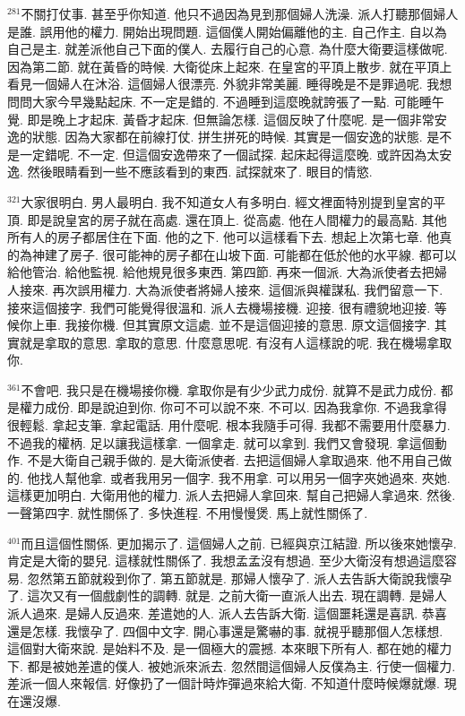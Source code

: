 \documentclass{book}
\begin{document}
$^{281}$不關打仗事.
甚至乎你知道.
他只不過因為見到那個婦人洗澡.
派人打聽那個婦人是誰.
誤用他的權力.
開始出現問題.
這個僕人開始偏離他的主.
自己作主.
自以為自己是主.
就差派他自己下面的僕人.
去履行自己的心意.
為什麼大衛要這樣做呢.
因為第二節.
就在黃昏的時候.
大衛從床上起來.
在皇宮的平頂上散步.
就在平頂上看見一個婦人在沐浴.
這個婦人很漂亮.
外貌非常美麗.
睡得晚是不是罪過呢.
我想問問大家今早幾點起床.
不一定是錯的.
不過睡到這麼晚就誇張了一點.
可能睡午覺.
即是晚上才起床.
黃昏才起床.
但無論怎樣.
這個反映了什麼呢.
是一個非常安逸的狀態.
因為大家都在前線打仗.
拼生拼死的時候.
其實是一個安逸的狀態.
是不是一定錯呢.
不一定.
但這個安逸帶來了一個試探.
起床起得這麼晚.
或許因為太安逸.
然後眼睛看到一些不應該看到的東西.
試探就來了.
眼目的情慾.

$^{321}$大家很明白.
男人最明白.
我不知道女人有多明白.
經文裡面特別提到皇宮的平頂.
即是說皇宮的房子就在高處.
還在頂上.
從高處.
他在人間權力的最高點.
其他所有人的房子都居住在下面.
他的之下.
他可以這樣看下去.
想起上次第七章.
他真的為神建了房子.
很可能神的房子都在山坡下面.
可能都在低於他的水平線.
都可以給他管治.
給他監視.
給他規見很多東西.
第四節.
再來一個派.
大為派使者去把婦人接來.
再次誤用權力.
大為派使者將婦人接來.
這個派與權謀私.
我們留意一下.
接來這個接字.
我們可能覺得很溫和.
派人去機場接機.
迎接.
很有禮貌地迎接.
等候你上車.
我接你機.
但其實原文這處.
並不是這個迎接的意思.
原文這個接字.
其實就是拿取的意思.
拿取的意思.
什麼意思呢.
有沒有人這樣說的呢.
我在機場拿取你.

$^{361}$不會吧.
我只是在機場接你機.
拿取你是有少少武力成份.
就算不是武力成份.
都是權力成份.
即是說迫到你.
你可不可以說不來.
不可以.
因為我拿你.
不過我拿得很輕鬆.
拿起支筆.
拿起電話.
用什麼呢.
根本我隨手可得.
我都不需要用什麼暴力.
不過我的權柄.
足以讓我這樣拿.
一個拿走.
就可以拿到.
我們又會發現.
拿這個動作.
不是大衛自己親手做的.
是大衛派使者.
去把這個婦人拿取過來.
他不用自己做的.
他找人幫他拿.
或者我用另一個字.
我不用拿.
可以用另一個字夾她過來.
夾她.
這樣更加明白.
大衛用他的權力.
派人去把婦人拿回來.
幫自己把婦人拿過來.
然後.
一聲第四字.
就性關係了.
多快進程.
不用慢慢煲.
馬上就性關係了.

$^{401}$而且這個性關係.
更加揭示了.
這個婦人之前.
已經與京江結證.
所以後來她懷孕.
肯定是大衛的嬰兒.
這樣就性關係了.
我想孟孟沒有想過.
至少大衛沒有想過這麼容易.
忽然第五節就殺到你了.
第五節就是.
那婦人懷孕了.
派人去告訴大衛說我懷孕了.
這次又有一個戲劇性的調轉.
就是.
之前大衛一直派人出去.
現在調轉.
是婦人派人過來.
是婦人反過來.
差遣她的人.
派人去告訴大衛.
這個噩耗還是喜訊.
恭喜還是怎樣.
我懷孕了.
四個中文字.
開心事還是驚嚇的事.
就視乎聽那個人怎樣想.
這個對大衛來說.
是始料不及.
是一個極大的震撼.
本來眼下所有人.
都在她的權力下.
都是被她差遣的僕人.
被她派來派去.
忽然間這個婦人反僕為主.
行使一個權力.
差派一個人來報信.
好像扔了一個計時炸彈過來給大衛.
不知道什麼時候爆就爆.
現在還沒爆.
\end{document}
